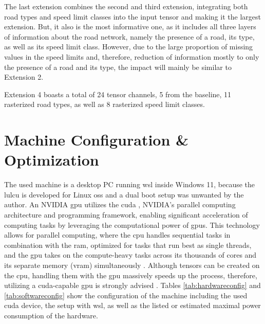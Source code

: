 The last extension combines the second and third extension, integrating both road types and speed limit classes into the input tensor and making it the largest extension. But, it also is the most informative one, as it includes all three layers of information about the road network, namely the presence of a road, its type, as well as its speed limit class. However, due to the large proportion of missing values in the speed limits and, therefore, reduction of information mostly to only the presence of a road and its type, the impact will mainly be similar to Extension 2.

Extension 4 boasts a total of 24 tensor channels, 5 from the baseline, 11 rasterized road types, as well as 8 rasterized speed limit classes.

\section{Machine Configuration \& Optimization}
\label{subsec:machine_config}

The used machine is a desktop PC running \gls{wsl} inside Windows 11, because the \gls{lulcu} is developed for Linux \glspl{os} and a dual boot setup was unwanted by the author. An NVIDIA \gls{gpu} utilizes the \gls{cuda} \autocite{NVIDIACorporation2024}, NVIDIA's parallel computing architecture and programming framework, enabling significant acceleration of computing tasks by leveraging the computational power of \glspl{gpu}. This technology allows for parallel computing, where the \gls{cpu} handles sequential tasks in combination with the \gls{ram}, optimized for tasks that run best as single threads, and the \gls{gpu} takes on the compute-heavy tasks across its thousands of cores and its separate memory (\gls{vram}) simultaneously \autocite{NVIDIACorporation2024,Zhang.Lipton.ea2023}. Although tensors can be created on the \gls{cpu}, handling them with the \gls{gpu} massively speeds up the process, therefore, utilizing a \gls{cuda}-capable \gls{gpu} is strongly advised \autocite{Zhang.Lipton.ea2023}. Tables \ref{tab:hardwareconfig} and \ref{tab:softwareconfig} show the configuration of the machine including the used \gls{cuda} device, the setup with \gls{wsl}, as well as the listed or estimated maximal power consumption of the hardware.


